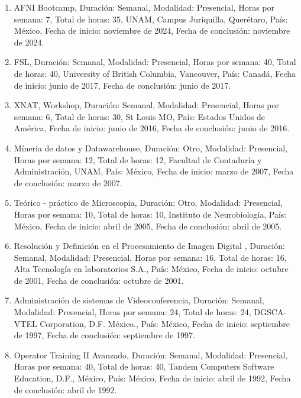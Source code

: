 \documentclass[12pt]{article}
\begin{document}
\begin{enumerate}
\item AFNI Bootcamp, Duración: Semanal, Modalidad: Presencial, Horas por semana: 7, Total de horas: 35, UNAM, Campus Juriquilla, 
Querétaro, País: México, Fecha de inicio: noviembre de 2024, Fecha de conclusión: noviembre de 2024.

\item FSL, Duración: Semanal, Modalidad: Presencial, Horas por semana: 40, Total de horas: 40, University of British Columbia, 
Vancouver, 
País: Canadá, Fecha de inicio: junio de 2017, Fecha de conclusión: junio de 2017.

\item XNAT, Workshop, Duración: Semanal, Modalidad: Presencial, Horas por semana: 6, Total de horas: 30, St Louis MO, País: Estados 
Unidos 
de América, Fecha de inicio: junio de 2016, Fecha de conclusión: junio de 
2016.

\item Míneria de datos y Datawarehouse, Duración: Otro, Modalidad: Presencial, Horas por semana: 12, Total de horas: 12, Facultad de 
Contaduría y Administración, UNAM, País: México, Fecha de inicio: marzo de 2007, Fecha de conclusión: marzo de 2007.

\item Teórico - práctico de Microscopia, Duración: Otro, Modalidad: Presencial, Horas por semana: 10, Total de horas: 10, Instituto de 
Neurobiología, País: México, Fecha de inicio: abril de 2005, Fecha de conclusión: abril de 2005.

\item Resolución y Definición en el Procesamiento de Imagen Digital , Duración: Semanal, Modalidad: Presencial, Horas por semana: 16, 
Total de horas: 16, Alta Tecnología en laboratorios S.A., País: México, Fecha de inicio: octubre de 2001, Fecha de conclusión: octubre 
de 2001.

\item Administración de sistemas de Videoconferencia, Duración: Semanal, Modalidad: Presencial, Horas por semana: 24, Total de horas: 
24, 
DGSCA-VTEL Corporation, D.F. México., País: México, Fecha de inicio: septiembre de 1997, Fecha de conclusión: septiembre de 1997.

\item Operator Training II Avanzado, Duración: Semanal, Modalidad: Presencial, Horas por semana: 40, Total de horas: 40, Tandem 
Computers 
Software Education, D.F., México, País: México, Fecha de inicio: abril de 1992, Fecha de conclusión: abril de 1992.


\end{enumerate}
\end{document}
